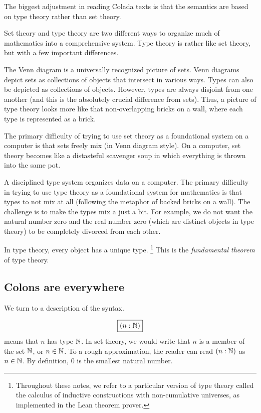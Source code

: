 \documentclass[12pt]{article}
\numberwithin{definition}{section}
\begin{document}
The biggest adjustment in reading Colada texts is that the semantics
are based on type theory rather than set theory.

Set theory and type theory are two different ways to organize much of
mathematics into a comprehensive system.  Type theory is rather like
set theory, but with a few important differences.

The Venn diagram is a universally recognized picture of sets. Venn
diagrams depict sets as collections of objects that intersect in
various ways. Types can also be depicted as collections of objects.
However, types are always disjoint from one another (and this is the
absolutely crucial difference from sets).  Thus, a picture of type
theory looks more like that non-overlapping bricks on a wall, where
each type is represented as a brick.

The primary difficulty of trying to use set theory as a foundational
system on a computer is that sets freely mix (in Venn diagram style).
On a computer, set theory becomes like a distasteful scavenger soup in which
everything is thrown into the same pot.

A disciplined type system organizes data on a computer.  The primary
difficulty in trying to use type theory as a foundational system for
mathematics is that types to not mix at all (following the metaphor of
backed bricks on a wall).  The challenge is to make the types mix a
just a bit.  For example, we do not want the natural number zero and
the real number zero (which are distinct objects in type theory) to be
completely divorced from each other.

In type theory, every object has a unique type.%
%
\footnote{Throughout these notes, we refer to a particular version of
  type theory called the calculus of inductive constructions with
  non-cumulative universes, as implemented in the Lean theorem
  prover.}
%
This is the \emph{fundamental theorem} of type theory.



\subsection{Colons are everywhere}

We turn to a description of the syntax.

\[
\boxed{(n : {\mathbb N})}
\]
means that $n$ has type ${\mathbb N}$.  In set theory, we would write that
$n$ is a member of the set ${\mathbb N}$, or $n \in {\mathbb N}$.  To a rough
approximation, the reader can read $(n : {\mathbb N})$ as $n\in {\mathbb N}$.
By definition, $0$ is the smallest natural number.
\end{document}
